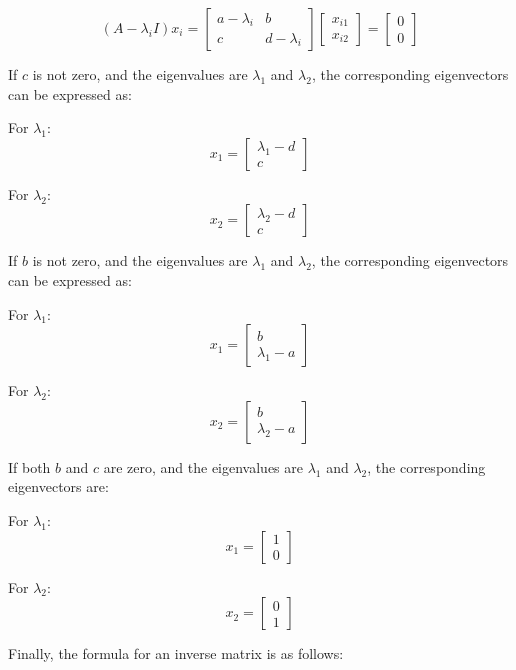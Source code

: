 \documentclass{article}
\begin{document}
\[
    (A - \lambda_i I)x_i = \begin{bmatrix} a - \lambda_i & b \\ c & d - \lambda_i \end{bmatrix} \begin{bmatrix} x_{i1} \\ x_{i2} \end{bmatrix} = \begin{bmatrix} 0 \\ 0 \end{bmatrix}
\]

If \(c\) is not zero, and the eigenvalues are \(\lambda_1\) and \(\lambda_2\), the corresponding eigenvectors can be expressed as:

For \(\lambda_1\):
\[
    x_1 = \begin{bmatrix} \lambda_1 - d \\ c \end{bmatrix}
\]

For \(\lambda_2\):
\[
    x_2 = \begin{bmatrix} \lambda_2 - d \\ c \end{bmatrix}
\]

If \( b \) is not zero, and the eigenvalues are \( \lambda_1 \) and \( \lambda_2 \), the corresponding eigenvectors can be expressed as:

For \( \lambda_1 \):
\[
    x_1 = \begin{bmatrix} b \\ \lambda_1 - a \end{bmatrix}
\]

For \( \lambda_2 \):
\[
    x_2 = \begin{bmatrix} b \\ \lambda_2 - a \end{bmatrix}
\]

If both \( b \) and \( c \) are zero, and the eigenvalues are \( \lambda_1 \) and \( \lambda_2 \), the corresponding eigenvectors are:

For \( \lambda_1 \):
\[
    x_1 = \begin{bmatrix} 1 \\ 0 \end{bmatrix}
\]

For \( \lambda_2 \):
\[
    x_2 = \begin{bmatrix} 0 \\ 1 \end{bmatrix}
\]

Finally, the formula for an inverse matrix is as follows:
\end{document}
